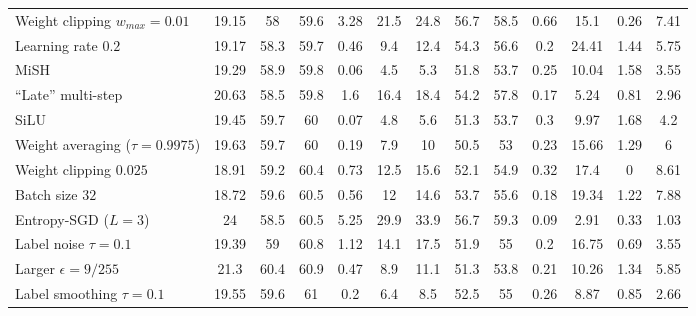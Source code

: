 \begin{table}[t]
{\begin{tabularx}{\textwidth}{|X|c|c|c||c|c|c||c|c||c|c|c|c|}
		\rowcolor{colorbrewer5!15}\hspace*{2px} Weight clipping $w_{max}{=}0.01$ & 19.15 & 58 & 59.6 & 3.28 & 21.5 & 24.8 & 56.7 & 58.5 & 0.66 & 15.1 & 0.26 & 7.41\\
		\rowcolor{colorbrewer5!15}\hspace*{2px} Learning rate $0.2$ & 19.17 & 58.3 & 59.7 & 0.46 & 9.4 & 12.4 & 54.3 & 56.6 & 0.2 & 24.41 & 1.44 & 5.75\\
		\rowcolor{colorbrewer5!15}\hspace*{2px} MiSH & 19.29 & 58.9 & 59.8 & 0.06 & 4.5 & 5.3 & 51.8 & 53.7 & 0.25 & 10.04 & 1.58 & 3.55\\
		\rowcolor{colorbrewer5!15}\hspace*{2px} ``Late'' multi-step & 20.63 & 58.5 & 59.8 & 1.6 & 16.4 & 18.4 & 54.2 & 57.8 & 0.17 & 5.24 & 0.81 & 2.96\\
		\hline
		\rowcolor{colorbrewer1!15}\hspace*{2px} SiLU & 19.45 & 59.7 & 60 & 0.07 & 4.8 & 5.6 & 51.3 & 53.7 & 0.3 & 9.97 & 1.68 & 4.2\\
		\rowcolor{colorbrewer1!15}\hspace*{2px} Weight averaging ($\tau{=}0.9975$) & 19.63 & 59.7 & 60 & 0.19 & 7.9 & 10 & 50.5 & 53 & 0.23 & 15.66 & 1.29 & 6\\
		\rowcolor{colorbrewer1!15}\hspace*{2px} Weight clipping $0.025$ & 18.91 & 59.2 & 60.4 & 0.73 & 12.5 & 15.6 & 52.1 & 54.9 & 0.32 & 17.4 & 0 & 8.61\\
		\rowcolor{colorbrewer1!15}\hspace*{2px} Batch size $32$ & 18.72 & 59.6 & 60.5 & 0.56 & 12 & 14.6 & 53.7 & 55.6 & 0.18 & 19.34 & 1.22 & 7.88\\
		\rowcolor{colorbrewer1!15}\hspace*{2px} Entropy-SGD ($L{=}3$) & 24 & 58.5 & 60.5 & 5.25 & 29.9 & 33.9 & 56.7 & 59.3 & 0.09 & 2.91 & 0.33 & 1.03\\
		\rowcolor{colorbrewer1!15}\hspace*{2px} Label noise $\tau{=}0.1$ & 19.39 & 59 & 60.8 & 1.12 & 14.1 & 17.5 & 51.9 & 55 & 0.2 & 16.75 & 0.69 & 3.55\\
		\rowcolor{colorbrewer1!15}\hspace*{2px} Larger $\epsilon{=}9/255$ & 21.3 & 60.4 & 60.9 & 0.47 & 8.9 & 11.1 & 51.3 & 53.8 & 0.21 & 10.26 & 1.34 & 5.85\\
		\rowcolor{colorbrewer1!15}\hspace*{2px} Label smoothing $\tau{=}0.1$ & 19.55 & 59.6 & 61 & 0.2 & 6.4 & 8.5 & 52.5 & 55 & 0.26 & 8.87 & 0.85 & 2.66\\

\end{tabularx}}
\end{table}
